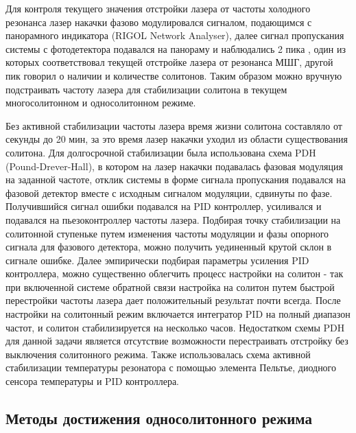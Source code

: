 Для контроля текущего значения отстройки лазера от частоты холодного резонанса лазер накачки фазово модулировался сигналом, подающимся с панорамного индикатора (RIGOL Network Analyser), далее сигнал пропускания системы с фотодетектора подавался на панораму и наблюдались 2 пика \cite{Karpov2017}, один из которых соответствовал текущей отстройке лазера от резонанса МШГ, другой пик говорил о наличии и количестве солитонов. Таким образом можно вручную подстраивать частоту лазера для стабилизации солитона в текущем многосолитонном и односолитонном режиме.

Без активной стабилизации частоты лазера время жизни солитона составляло от секунды до 20 мин, за это время лазер накачки уходил из области существования солитона. Для долгосрочной стабилизации была использована схема PDH (Pound-Drever-Hall), в котором на лазер накачки подавалась фазовая модуляция на заданной частоте, отклик системы в форме сигнала пропускания подавался на фазовой детектор вместе с исходным сигналом модуляции, сдвинуты по фазе. Получившийся сигнал ошибки подавался на PID контроллер, усиливался и подавался на пьезоконтроллер частоты лазера. Подбирая точку стабилизации на солитонной ступеньке путем изменения частоты модуляции и фазы опорного сигнала для фазового детектора, можно получить уединенный крутой склон в сигнале ошибке. Далее эмпирически подбирая параметры усиления PID контроллера, можно существенно облегчить процесс настройки на солитон - так при включенной системе обратной связи настройка на солитон путем быстрой перестройки частоты лазера дает положительный результат почти всегда. После настройки на солитонный режим включается интегратор PID на полный диапазон частот, и солитон стабилизируется на несколько часов. Недостатком схемы PDH для данной задачи является отсутствие возможности перестраивать отстройку без выключения солитонного режима. Также использовалась схема активной стабилизации температуры резонатора с помощью элемента Пельтье, диодного сенсора температуры и PID контроллера.


\subsection{Методы достижения односолитонного режима}

